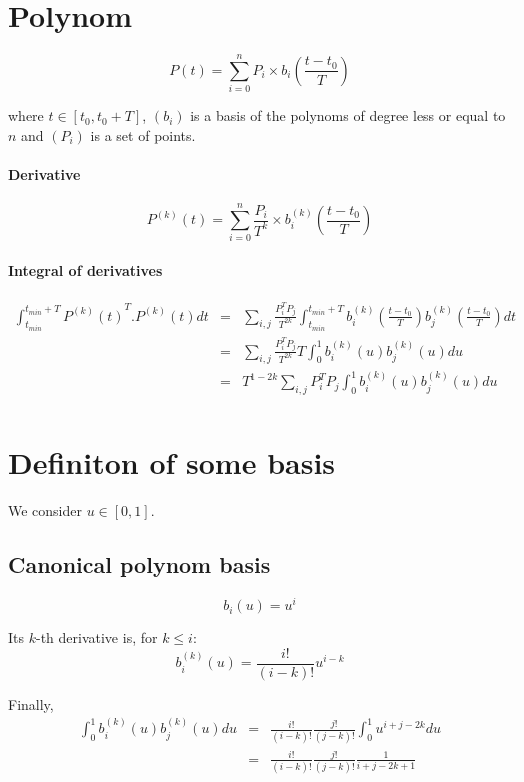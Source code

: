 \documentclass {article}
\begin{document}
\section{Polynom}

$$
P (t) = \sum_{i=0}^n P_i \times b_i(\frac{t - t_0}{T})
$$

where $t \in \left[ t_0, t_0 + T \right]$, $(b_i)$ is a basis of the polynoms
of degree less or equal to $n$ and $(P_i)$ is a set of points.

\paragraph{Derivative}

$$
P^{(k)} (t) = \sum_{i=0}^n \frac{P_i}{T^k} \times b_i^{(k)}(\frac{t - t_0}{T})
$$

\paragraph{Integral of derivatives}
\begin{eqnarray*}
\int_{t_{min}}^{t_{min} + T} {P^{(k)} (t)}^T . P^{(k)} (t) dt
&=& \sum_{i,j} \frac{P_i^T P_j}{T^{2k}} \int_{t_{min}}^{t_{min} + T} b_i^{(k)}(\frac{t - t_0}{T}) b_j^{(k)}(\frac{t - t_0}{T}) dt \\
&=& \sum_{i,j} \frac{P_i^T P_j}{T^{2k}} T \int_0^1 b_i^{(k)}(u) b_j^{(k)}(u) du \\
&=& T^{1-2k} \sum_{i,j} P_i^T P_j \int_0^1 b_i^{(k)}(u) b_j^{(k)}(u) du \\
\end{eqnarray*}

\section{Definiton of some basis}

We consider $u \in \left[ 0,1 \right]$.

\subsection {Canonical polynom basis}

$$
b_i(u) = u^i
$$

Its $k$-th derivative is, for $k \le i$:
$$
b_i^{(k)} (u) = \frac{i!}{(i-k)!} u^{i-k}
$$

Finally,
\begin{eqnarray*}
\int_0^1 b_i^{(k)} (u) b_j^{(k)} (u) du
&=& \frac{i!}{(i-k)!} \frac{j!}{(j-k)!} \int_0^1 u^{i+j-2k} du \\
&=& \frac{i!}{(i-k)!} \frac{j!}{(j-k)!} \frac{1}{i+j-2k+1}
\end{eqnarray*}
\end{document}
